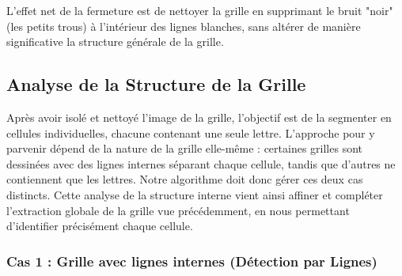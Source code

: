 \documentclass{article}
\begin{document}
L'effet net de la fermeture est de nettoyer la grille en supprimant le bruit "noir" (les petits trous) à l'intérieur des lignes blanches, sans altérer de manière significative la structure générale de la grille.

\subsection{Analyse de la Structure de la Grille}

Après avoir isolé et nettoyé l'image de la grille, l'objectif est de la segmenter en cellules individuelles, chacune contenant une seule lettre. L'approche pour y parvenir dépend de la nature de la grille elle-même : certaines grilles sont dessinées avec des lignes internes séparant chaque cellule, tandis que d'autres ne contiennent que les lettres. Notre algorithme doit donc gérer ces deux cas distincts.
Cette analyse de la structure interne vient ainsi affiner et compléter l'extraction globale de la grille vue précédemment, en nous permettant d'identifier précisément chaque cellule.

\subsubsection{Cas 1 : Grille avec lignes internes (Détection par Lignes)}
\end{document}
